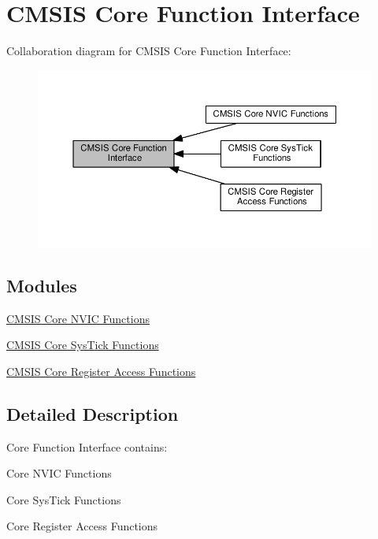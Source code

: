 \hypertarget{group___c_m_s_i_s___core___function_interface}{}\section{C\+M\+S\+IS Core Function Interface}
\label{group___c_m_s_i_s___core___function_interface}
Collaboration diagram for C\+M\+S\+IS Core Function Interface\+:\nopagebreak
\begin{figure}[H]
\begin{center}
\leavevmode
\includegraphics[width=350pt]{group___c_m_s_i_s___core___function_interface}
\end{center}
\end{figure}
\subsection*{Modules}
\begin{DoxyCompactItemize}
\item 
\hyperlink{group___c_m_s_i_s___core___n_v_i_c_functions}{C\+M\+S\+I\+S Core N\+V\+I\+C Functions}
\item 
\hyperlink{group___c_m_s_i_s___core___sys_tick_functions}{C\+M\+S\+I\+S Core Sys\+Tick Functions}
\item 
\hyperlink{group___c_m_s_i_s___core___reg_acc_functions}{C\+M\+S\+I\+S Core Register Access Functions}
\end{DoxyCompactItemize}


\subsection{Detailed Description}
Core Function Interface contains\+:
\begin{DoxyItemize}
\item Core N\+V\+IC Functions
\item Core Sys\+Tick Functions
\item Core Register Access Functions 
\end{DoxyItemize}